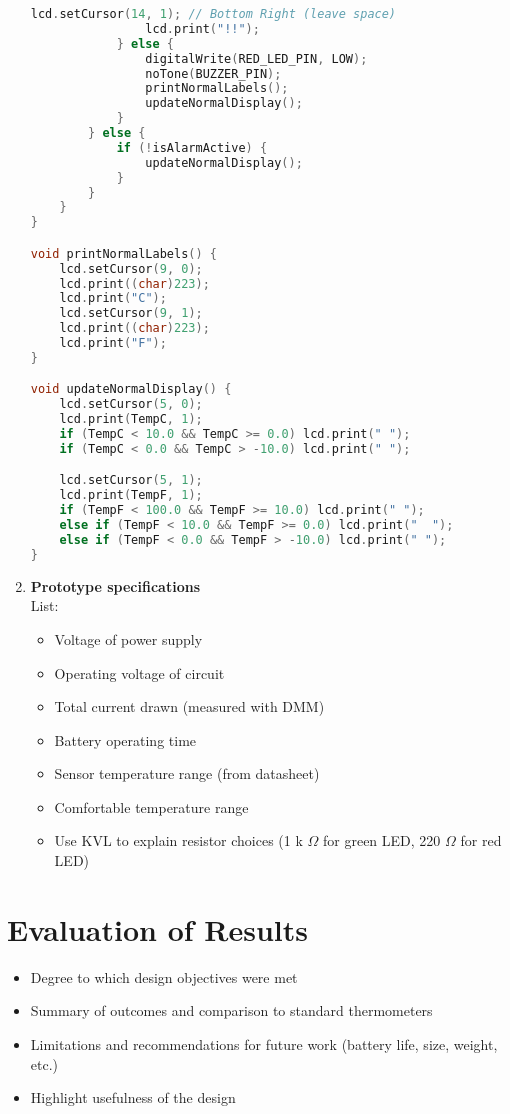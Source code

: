\documentclass[10pt]{article}
\begin{document}
\begin{enumerate}[label=\Alph*.]
\begin{lstlisting}[language=C, caption={Arduino sketch for running average temperature monitoring}]
				lcd.setCursor(14, 1); // Bottom Right (leave space)
				lcd.print("!!");
			} else {
				digitalWrite(RED_LED_PIN, LOW);
				noTone(BUZZER_PIN);
				printNormalLabels();
				updateNormalDisplay();
			}
		} else {
			if (!isAlarmActive) {
				updateNormalDisplay();
			}
		}
	}
}

void printNormalLabels() {
	lcd.setCursor(9, 0);
	lcd.print((char)223);
	lcd.print("C");
	lcd.setCursor(9, 1);
	lcd.print((char)223);
	lcd.print("F");
}

void updateNormalDisplay() {
	lcd.setCursor(5, 0);
	lcd.print(TempC, 1);
	if (TempC < 10.0 && TempC >= 0.0) lcd.print(" ");
	if (TempC < 0.0 && TempC > -10.0) lcd.print(" ");

	lcd.setCursor(5, 1);
	lcd.print(TempF, 1);
	if (TempF < 100.0 && TempF >= 10.0) lcd.print(" ");
	else if (TempF < 10.0 && TempF >= 0.0) lcd.print("  ");
	else if (TempF < 0.0 && TempF > -10.0) lcd.print(" ");
}
\end{lstlisting}


	\item \textbf{Prototype specifications}\\ List: \begin{itemize} \item Voltage of
		            power supply \item Operating voltage of circuit \item Total current drawn
		            (measured with DMM) \item Battery operating time \item Sensor temperature range
		            (from datasheet) \item Comfortable temperature range \item Use KVL to explain
		            resistor choices (1 k $\Omega$ for green LED, 220 $\Omega$ for red LED)
	      \end{itemize}

\end{enumerate}

\section{Evaluation of Results} \begin{itemize} \item Degree to which design
	      objectives were met \item Summary of outcomes and comparison to standard
	      thermometers \item Limitations and recommendations for future work (battery
	      life, size, weight, etc.) \item Highlight usefulness of the design \end{itemize}
\end{document}

